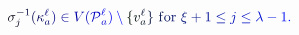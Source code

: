 \documentclass[12pt]{article}
\begin{document}
\makeatletter
\renewcommand*{\@textcolor}[3]{%
  \protect\leavevmode
  \begingroup
    \color#1{#2}#3%
  \endgroup
}
\makeatother
\begin{displaymath}
\mathcolor[RGB]{0,0,15}{\sigma} _ { \mathcolor[RGB]{0,0,30}{j} } ^ { \mathcolor[RGB]{0,0,45}{-} \mathcolor[RGB]{0,0,60}{1} } \mathcolor[RGB]{0,0,75}{(} \mathcolor[RGB]{0,0,90}{\kappa} _ { \mathcolor[RGB]{0,0,105}{a} } ^ { \mathcolor[RGB]{0,0,120}{\ell} } \mathcolor[RGB]{0,0,135}{)} \mathcolor[RGB]{0,0,150}{\in} \mathcolor[RGB]{0,0,165}{V} \mathcolor[RGB]{0,0,180}{(} \mathcal { \mathcolor[RGB]{0,0,195}{P} } _ { \mathcolor[RGB]{0,0,210}{a} } ^ { \mathcolor[RGB]{0,0,225}{\ell} } \mathcolor[RGB]{0,0,240}{)} \mathcolor[RGB]{0,0,255}{\setminus} \mathcolor[RGB]{0,15,0}{\{} \mathcolor[RGB]{0,15,15}{v} _ { \mathcolor[RGB]{0,15,30}{a} } ^ { \mathcolor[RGB]{0,15,45}{\ell} } \mathcolor[RGB]{0,15,60}{\}} \mathrm { ~ \mathcolor[RGB]{0,15,75}{f} \mathcolor[RGB]{0,15,90}{o} \mathcolor[RGB]{0,15,105}{r} ~ } \mathcolor[RGB]{0,15,120}{\xi} \mathcolor[RGB]{0,15,135}{+} \mathcolor[RGB]{0,15,150}{1} \mathcolor[RGB]{0,15,165}{\leq} \mathcolor[RGB]{0,15,180}{j} \mathcolor[RGB]{0,15,195}{\leq} \mathcolor[RGB]{0,15,210}{\lambda} \mathcolor[RGB]{0,15,225}{-} \mathcolor[RGB]{0,15,240}{1} \mathcolor[RGB]{0,15,255}{.}
\end{displaymath}
\end{document}

